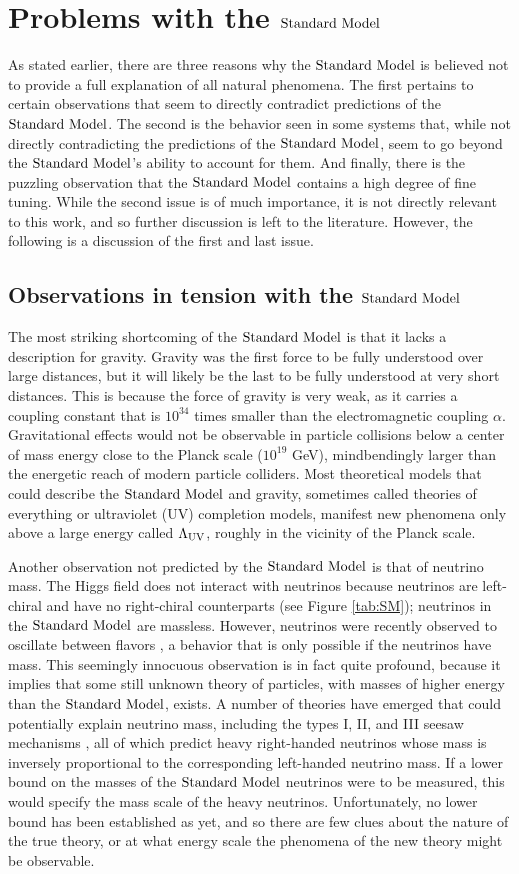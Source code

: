 \section{Problems with the $\text{Standard\ Model}$}
\label{sec:problems}
As stated earlier, there are three reasons why the $\text{Standard\ Model}$ is believed not to provide a full explanation of all natural phenomena. The first pertains to certain observations that seem to directly contradict predictions of the $\text{Standard\ Model}$. The second is the behavior seen in some systems that, while not directly contradicting the predictions of the $\text{Standard\ Model}$, seem to go beyond the $\text{Standard\ Model}$'s ability to account for them. And finally, there is the puzzling observation that the $\text{Standard\ Model}$ contains a high degree of fine tuning.  While the second issue is of much importance, it is not directly relevant to this work, and so further discussion is left to the literature. However, the following is a discussion of the first and last issue.

\subsection{Observations in tension with the $\text{Standard\ Model}$}
The most striking shortcoming of the $\text{Standard\ Model}$ is that it lacks a description for gravity.  Gravity was the first force to be fully understood over large distances, but it will likely be the last to be fully understood at very short distances. This is because the force of gravity is very weak, as it carries a coupling constant that is $10^{34}$ times smaller than the electromagnetic coupling $\alpha$. Gravitational effects would not be observable in particle collisions below a center of mass energy close to the Planck scale ($10^{19}$ GeV), mindbendingly larger than the energetic reach of modern particle colliders. Most theoretical models that could describe the $\text{Standard\ Model}$ and gravity, sometimes called theories of everything or ultraviolet (UV) completion models, manifest new phenomena only above a large energy called $\Lambda_{\rm UV}$, roughly in the vicinity of the Planck scale. 

Another observation not predicted by the $\text{Standard\ Model}$ is that of neutrino mass.  The Higgs field does not interact with neutrinos because neutrinos are left-chiral and have no right-chiral counterparts (see Figure \ref{tab:SM}); neutrinos in the $\text{Standard\ Model}$ are massless. However, neutrinos were recently observed to oscillate between flavors \cite{Fukuda:1998mi}, a behavior that is only possible if the neutrinos have mass. This seemingly innocuous observation is in fact quite profound, because it implies that some still unknown theory of particles, with masses of higher energy than the $\text{Standard\ Model}$, exists. A number of theories have emerged that could potentially explain neutrino mass, including the types I, II, and III seesaw mechanisms \cite{Yanagida:1980xy}, all of which predict heavy right-handed neutrinos whose mass is inversely proportional to the corresponding left-handed neutrino mass. If a lower bound on the masses of the $\text{Standard\ Model}$ neutrinos were to be measured, this would specify the mass scale of the heavy neutrinos. Unfortunately, no lower bound has been established as yet, and so there are few clues about the nature of the true theory, or at what energy scale the phenomena of the new theory might be observable.

